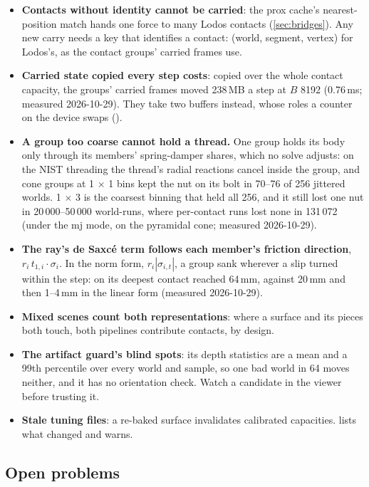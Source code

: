 \begin{itemize}
\item \textbf{Contacts without identity cannot be carried}: the prox cache's nearest-position match hands one force to many Lodos contacts (\cref{sec:bridges}). Any new carry needs a key that identifies a contact: (world, segment, vertex) for Lodos's, as the contact groups' carried frames use.
\item \textbf{Carried state copied every step costs}: copied over the whole contact capacity, the groups' carried frames moved 238\,MB a step at $B$ 8192 (0.76\,ms; measured 2026-10-29). They take two buffers instead, whose roles a counter on the device swaps ().
\item \textbf{A group too coarse cannot hold a thread.} One group holds its body only through its members' spring-damper shares, which no solve adjusts: on the NIST threading the thread's radial reactions cancel inside the group, and cone groups at 1 $\times$ 1 bins kept the nut on its bolt in 70--76 of 256 jittered worlds. 1 $\times$ 3 is the coarsest binning that held all 256, and it still lost one nut in 20\,000--50\,000 world-runs, where per-contact runs lost none in 131\,072 (under the mj mode, on the pyramidal cone; measured 2026-10-29).
\item \textbf{The ray's de Saxc\'e term follows each member's friction direction}, $r_i\, t_{1,i} \cdot \sigma_i$. In the norm form, $r_i |\sigma_{i,t}|$, a group sank wherever a slip turned within the step: on  its deepest contact reached 64\,mm, against 20\,mm and then 1--4\,mm in the linear form (measured 2026-10-29).
\item \textbf{Mixed scenes count both representations}: where a surface and its pieces both touch, both pipelines contribute contacts, by design.
\item \textbf{The artifact guard's blind spots}: its depth statistics are a mean and a 99th percentile over every world and sample, so one bad world in 64 moves neither, and it has no orientation check. Watch a candidate in the viewer before trusting it.
\item \textbf{Stale tuning files}: a re-baked surface invalidates calibrated capacities.  lists what changed and  warns.
\end{itemize}

\subsection{Open problems}\label{sec:open}

